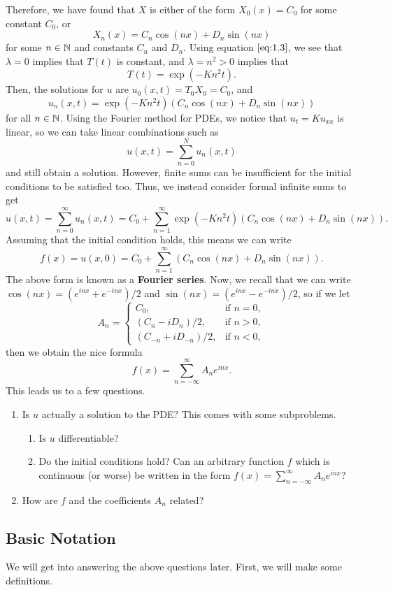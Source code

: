 Therefore, we have found that $X$ is either of the form $X_0(x) = C_0$
for some constant $C_0$, or 
\[ X_n(x) = C_n\cos(nx) + D_n\sin(nx) \] 
for some $n \in \mathbb{N}$ and constants $C_n$ and $D_n$. Using equation 
$\eqref{eq:1.3}$, we see that $\lambda = 0$ implies that $T(t)$ is constant, 
and $\lambda = n^2 > 0$ implies that 
\[ T(t) = \exp(-Kn^2t). \] 
Then, the solutions for $u$ are $u_0(x, t) = T_0 X_0 = C_0$, and 
\[ u_n(x, t) = \exp(-Kn^2t) (C_n\cos(nx) + D_n\sin(nx)) \]
for all $n \in \mathbb{N}$. Using the Fourier method for PDEs, we notice that 
$u_t = Ku_{xx}$ is linear, so we can take linear combinations such as 
\[ u(x, t) = \sum_{n=0}^N u_n(x, t) \] 
and still obtain a solution. However, finite sums can be insufficient 
for the initial conditions to be satisfied too. Thus, we instead 
consider formal infinite sums to get 
\[ u(x, t) = \sum_{n=0}^\infty u_n(x, t) = C_0 + \sum_{n=1}^\infty 
\exp(-Kn^2t) (C_n\cos(nx) + D_n\sin(nx)). \] 
Assuming that the initial condition holds, this means we can write 
\[ f(x) = u(x, 0) = C_0 + \sum_{n=1}^\infty (C_n\cos(nx) + D_n\sin(nx)). \] 
The above form is known as a {\bf Fourier series}. Now, we recall that 
we can write $\cos(nx) = (e^{inx} + e^{-inx})/2$ and $\sin(nx) = 
(e^{inx} - e^{-inx})/2$, so if we let 
\[ A_n = \begin{cases} 
    C_0, & \text{if } n = 0, \\ 
    (C_n - iD_n)/2, & \text{if } n > 0, \\ 
    (C_{-n} + iD_{-n})/2, & \text{if } n < 0, 
\end{cases} \] 
then we obtain the nice formula 
\[ f(x) = \sum_{n=-\infty}^{\infty} A_n e^{inx}. \] 
This leads us to a few questions.
\begin{enumerate}
    \item Is $u$ actually a solution to the PDE? This comes with some subproblems.
    \begin{enumerate}
        \item Is $u$ differentiable? 
        \item Do the initial conditions hold? Can an arbitrary function 
        $f$ which is continuous (or worse) be written in the form 
        $f(x) = \sum_{n=-\infty}^\infty A_n e^{inx}$?
    \end{enumerate}
    \item How are $f$ and the coefficients $A_n$ related?
\end{enumerate}

\subsection{Basic Notation}
We will get into answering the above questions later. First, we will make 
some definitions.

